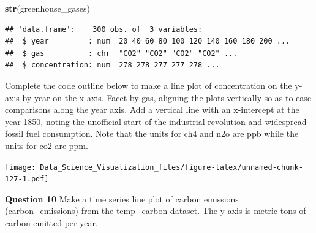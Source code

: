 \documentclass[
]{article}
\newenvironment{Shaded}{\begin{snugshade}}{\end{snugshade}}
\newcommand{\DataTypeTok}[1]{\textcolor[rgb]{0.13,0.29,0.53}{#1}}
\newcommand{\DecValTok}[1]{\textcolor[rgb]{0.00,0.00,0.81}{#1}}
\newcommand{\KeywordTok}[1]{\textcolor[rgb]{0.13,0.29,0.53}{\textbf{#1}}}
\newcommand{\NormalTok}[1]{#1}
\newcommand{\OperatorTok}[1]{\textcolor[rgb]{0.81,0.36,0.00}{\textbf{#1}}}
\newcommand{\StringTok}[1]{\textcolor[rgb]{0.31,0.60,0.02}{#1}}
\begin{document}
\begin{Shaded}
\begin{Highlighting}[]
\KeywordTok{str}\NormalTok{(greenhouse_gases)}
\end{Highlighting}
\end{Shaded}

\begin{verbatim}
## 'data.frame':    300 obs. of  3 variables:
##  $ year         : num  20 40 60 80 100 120 140 160 180 200 ...
##  $ gas          : chr  "CO2" "CO2" "CO2" "CO2" ...
##  $ concentration: num  278 278 277 277 278 ...
\end{verbatim}

Complete the code outline below to make a line plot of concentration on
the y-axis by year on the x-axis. Facet by gas, aligning the plots
vertically so as to ease comparisons along the year axis. Add a vertical
line with an x-intercept at the year 1850, noting the unofficial start
of the industrial revolution and widespread fossil fuel consumption.
Note that the units for ch4 and n2o are ppb while the units for co2 are
ppm.

\begin{Shaded}
\end{Shaded}

\texttt{[image: Data\_Science\_Visualization\_files/figure-latex/unnamed-chunk-127-1.pdf]}

\textbf{Question 10} Make a time series line plot of carbon emissions
(carbon\_emissions) from the temp\_carbon dataset. The y-axis is metric
tons of carbon emitted per year.
\end{document}
